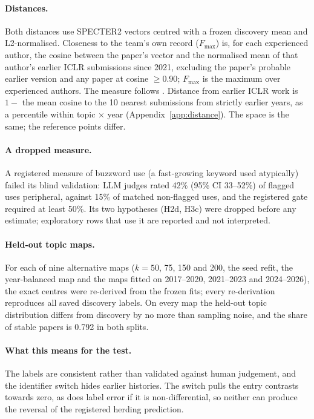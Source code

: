 \paragraph{Distances.} Both distances use SPECTER2 vectors centred with a frozen discovery mean and L2-normalised.
Closeness to the team's own record ($F_{\max}$) is, for each experienced author, the cosine between the paper's vector
and the normalised mean of that author's earlier ICLR submissions since 2021, excluding the paper's probable earlier
version and any paper at cosine $\geq 0.90$; $F_{\max}$ is the maximum over experienced authors. The measure follows
\citet{bao2025persistence}. Distance from earlier ICLR work is $1-$ the mean cosine to the 10 nearest submissions
from strictly earlier years, as a percentile within topic $\times$ year (Appendix~\ref{app:distance}). The space is
the same; the reference points differ.

\paragraph{A dropped measure.} A registered measure of buzzword use (a fast-growing keyword used atypically) failed
its blind validation: LLM judges rated 42\% (95\% CI 33--52\%) of flagged uses peripheral, against 15\% of matched
non-flagged uses, and the registered gate required at least 50\%. Its two hypotheses (H2d, H3c) were dropped before
any estimate; exploratory rows that use it are reported and not interpreted.

\paragraph{Held-out topic maps.} For each of nine alternative maps ($k=50$, 75, 150 and 200, the seed refit, the
year-balanced map and the maps fitted on 2017--2020, 2021--2023 and 2024--2026), the exact centres were re-derived
from the frozen fits; every re-derivation reproduces all saved discovery labels. On every map the held-out topic
distribution differs from discovery by no more than sampling noise, and the share of stable papers is 0.792 in both
splits.

\paragraph{What this means for the test.} The labels are consistent rather than validated against human judgement,
and the identifier switch hides earlier histories. The switch pulls the entry contrasts towards zero, as does label
error if it is non-differential, so neither can produce the reversal of the registered herding prediction.

